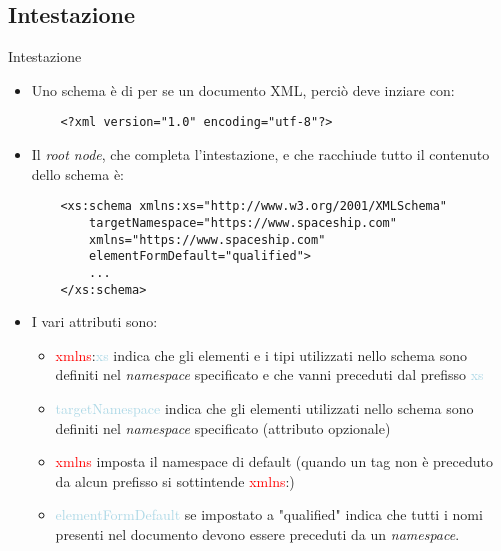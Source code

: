 \documentclass{beamer}
\begin{document}
	\subsection{Intestazione}
    \begin{frame}[containsverbatim]{Intestazione}
    \begin{itemize}
    \item Uno schema è di per se un documento XML, perciò deve inziare con:
    \begin{lstlisting}
	<?xml version="1.0" encoding="utf-8"?>
	\end{lstlisting}
	\item Il \textit{root node}, che completa l'intestazione, e che racchiude tutto il contenuto dello schema è:
	\begin{lstlisting}
	<xs:schema xmlns:xs="http://www.w3.org/2001/XMLSchema"
		targetNamespace="https://www.spaceship.com"
		xmlns="https://www.spaceship.com"
		elementFormDefault="qualified">
		...
	</xs:schema>
	\end{lstlisting}
    \end{itemize}
   \end{frame}
   \begin{frame}
   \begin{itemize}
   \item I vari attributi sono:
   \begin{itemize}
   		\item \textcolor{red}{xmlns}:\textcolor{lightblue}{xs} indica che gli elementi e i tipi utilizzati nello schema sono definiti nel \textit{namespace} specificato e che vanni preceduti dal prefisso \textcolor{lightblue}{xs}
   		\item \textcolor{lightblue}{targetNamespace} indica che gli elementi utilizzati nello schema sono definiti nel \textit{namespace} specificato (attributo opzionale)
   		\item \textcolor{red}{xmlns} imposta il namespace di default (quando un tag non è preceduto da alcun prefisso si sottintende \textcolor{red}{xmlns}:)
   		\item \textcolor{lightblue}{elementFormDefault} se impostato a \textcolor{mauve}{"qualified"} indica che tutti i nomi presenti nel documento devono essere preceduti da un \textit{namespace}.
   \end{itemize}
   \end{itemize}
   \end{frame}
   
\end{document}
